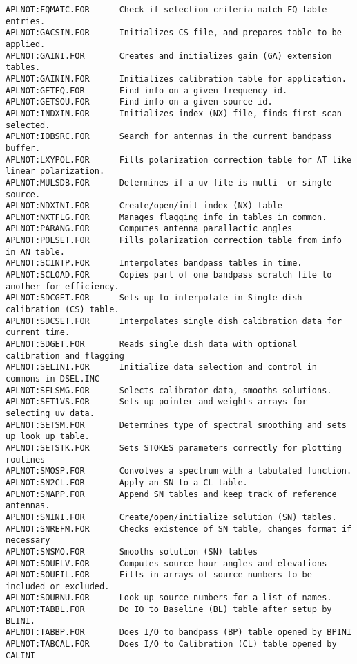 \begin{verbatim}
APLNOT:FQMATC.FOR      Check if selection criteria match FQ table entries.
APLNOT:GACSIN.FOR      Initializes CS file, and prepares table to be applied.
APLNOT:GAINI.FOR       Creates and initializes gain (GA) extension tables.
APLNOT:GAININ.FOR      Initializes calibration table for application.
APLNOT:GETFQ.FOR       Find info on a given frequency id.
APLNOT:GETSOU.FOR      Find info on a given source id.
APLNOT:INDXIN.FOR      Initializes index (NX) file, finds first scan selected.
APLNOT:IOBSRC.FOR      Search for antennas in the current bandpass buffer.
APLNOT:LXYPOL.FOR      Fills polarization correction table for AT like linear polarization.
APLNOT:MULSDB.FOR      Determines if a uv file is multi- or single- source.
APLNOT:NDXINI.FOR      Create/open/init index (NX) table
APLNOT:NXTFLG.FOR      Manages flagging info in tables in common.
APLNOT:PARANG.FOR      Computes antenna parallactic angles
APLNOT:POLSET.FOR      Fills polarization correction table from info in AN table.
APLNOT:SCINTP.FOR      Interpolates bandpass tables in time.
APLNOT:SCLOAD.FOR      Copies part of one bandpass scratch file to another for efficiency.
APLNOT:SDCGET.FOR      Sets up to interpolate in Single dish calibration (CS) table.
APLNOT:SDCSET.FOR      Interpolates single dish calibration data for current time.
APLNOT:SDGET.FOR       Reads single dish data with optional calibration and flagging
APLNOT:SELINI.FOR      Initialize data selection and control in commons in DSEL.INC
APLNOT:SELSMG.FOR      Selects calibrator data, smooths solutions.
APLNOT:SET1VS.FOR      Sets up pointer and weights arrays for selecting uv data.
APLNOT:SETSM.FOR       Determines type of spectral smoothing and sets up look up table.
APLNOT:SETSTK.FOR      Sets STOKES parameters correctly for plotting routines
APLNOT:SMOSP.FOR       Convolves a spectrum with a tabulated function.
APLNOT:SN2CL.FOR       Apply an SN to a CL table.
APLNOT:SNAPP.FOR       Append SN tables and keep track of reference antennas.
APLNOT:SNINI.FOR       Create/open/initialize solution (SN) tables.
APLNOT:SNREFM.FOR      Checks existence of SN table, changes format if necessary
APLNOT:SNSMO.FOR       Smooths solution (SN) tables
APLNOT:SOUELV.FOR      Computes source hour angles and elevations
APLNOT:SOUFIL.FOR      Fills in arrays of source numbers to be included or excluded.
APLNOT:SOURNU.FOR      Look up source numbers for a list of names.
APLNOT:TABBL.FOR       Do IO to Baseline (BL) table after setup by BLINI.
APLNOT:TABBP.FOR       Does I/O to bandpass (BP) table opened by BPINI
APLNOT:TABCAL.FOR      Does I/O to Calibration (CL) table opened by CALINI

\end{verbatim}

